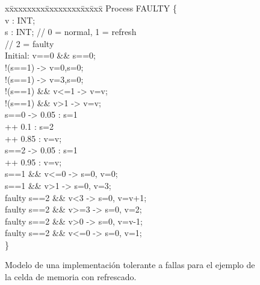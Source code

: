 \begin{figure}[t]
\centering
\begin{minipage}[t]{.47\textwidth}
\fontsize{10}{10}\selectfont\ttfamily
\begin{tabbing}
x\=xxxxxxxx\=xxxxxxxx\=xx\=xxx\= \kill    
Process FAULTY \{\\[1ex]
\>v : INT; \\
\>s : INT;  		 \>\>// 0 = normal, 1 = refresh\\ 
\>                   \>\>// 2 = faulty\\[1ex]
\>Initial: v==0 \&\& s==0;\\[1ex]
\>[write0]  !(s==1) -> v=0,s=0; \\
\>[write1]  !(s==1) -> v=3,s=0; \\[1ex]
\>[read0] !(s==1) \&\& v<=1 -> v=v; \\
\>[read1] !(s==1) \&\& v>1 -> v=v; \\[1ex]
 s==0 -> 0.05 : s=1 \\
\>             \>\>++ 0.1 : s=2 \\
\>             \>\>++ 0.85 : v=v; \\
 s==2 -> 0.05 : s=1 \\
\>             \>\>++ 0.95 : v=v; \\[1ex]
\>[refresh] s==1 \&\& v<=0 -> s=0, v=0; \\
\>[refresh] s==1 \&\& v>1 -> s=0, v=3; \\[1ex]
\>[f] faulty s==2 \&\& v<3 -> s=0, v=v+1; \\
\>[f] faulty s==2 \&\& v>=3 -> s=0, v=2; \\
\>[f] faulty s==2 \&\& v>0 -> s=0, v=v-1; \\
\>[f] faulty s==2 \&\& v<=0 -> s=0, v=1; \\[1ex]
\}\\
\end{tabbing}
\end{minipage}
\vspace{-0.5cm}
\caption{Modelo de una implementación tolerante a fallas para el ejemplo de la celda de memoria con refrescado.} \label{fig:exam_1_mem_cell_ft}
\vspace{-0.5cm}
\end{figure}

